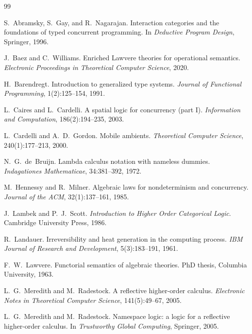 \documentclass[11pt]{article}
\theoremstyle{definition}
\theoremstyle{plain}
\theoremstyle{remark}
\begin{document}
\begin{thebibliography}{99}

S.~Abramsky, S.~Gay, and R.~Nagarajan.
\newblock Interaction categories and the foundations of typed concurrent programming.
\newblock In \emph{Deductive Program Design}, Springer, 1996.

J.~Baez and C.~Williams.
\newblock Enriched Lawvere theories for operational semantics.
\newblock \emph{Electronic Proceedings in Theoretical Computer Science}, 2020.

H.~Barendregt.
\newblock Introduction to generalized type systems.
\newblock \emph{Journal of Functional Programming}, 1(2):125--154, 1991.

L.~Caires and L.~Cardelli.
\newblock A spatial logic for concurrency (part I).
\newblock \emph{Information and Computation}, 186(2):194--235, 2003.

L.~Cardelli and A.~D.~Gordon.
\newblock Mobile ambients.
\newblock \emph{Theoretical Computer Science}, 240(1):177--213, 2000.

N.~G.~de~Bruijn.
\newblock Lambda calculus notation with nameless dummies.
\newblock \emph{Indagationes Mathematicae}, 34:381--392, 1972.

M.~Hennessy and R.~Milner.
\newblock Algebraic laws for nondeterminism and concurrency.
\newblock \emph{Journal of the ACM}, 32(1):137--161, 1985.

J.~Lambek and P.~J.~Scott.
\newblock \emph{Introduction to Higher Order Categorical Logic}.
\newblock Cambridge University Press, 1986.

R.~Landauer.
\newblock Irreversibility and heat generation in the computing process.
\newblock \emph{IBM Journal of Research and Development}, 5(3):183--191, 1961.

F.~W.~Lawvere.
\newblock Functorial semantics of algebraic theories.
\newblock PhD thesis, Columbia University, 1963.

L.~G.~Meredith and M.~Radestock.
\newblock A reflective higher-order calculus.
\newblock \emph{Electronic Notes in Theoretical Computer Science}, 141(5):49--67, 2005.

L.~G.~Meredith and M.~Radestock.
\newblock Namespace logic: a logic for a reflective higher-order calculus.
\newblock In \emph{Trustworthy Global Computing}, Springer, 2005.


\end{thebibliography}
\end{document}
